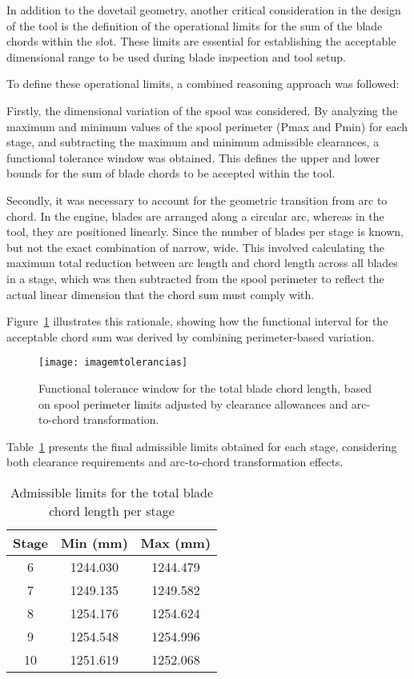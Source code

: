 In addition to the dovetail geometry, another critical consideration in the design of the tool is the definition of the operational limits for the sum of the blade chords within the slot. These limits are essential for establishing the acceptable dimensional range to be used during blade inspection and tool setup.

To define these operational limits, a combined reasoning approach was followed:

Firstly, the dimensional variation of the spool was considered. 
By analyzing the maximum and minimum values of the spool perimeter (Pmax and Pmin) for each stage, and subtracting the maximum and minimum admissible clearances, a functional tolerance window was obtained. 
This defines the upper and lower bounds for the sum of blade chords to be accepted within the tool.

Secondly, it was necessary to account for the geometric transition from arc to chord. 
In the engine, blades are arranged along a circular arc, whereas in the tool, they are positioned linearly. 
Since the number of blades per stage is known, but not the exact combination of narrow, wide. 
This involved calculating the maximum total reduction between arc length and chord length across all blades in a stage, which was then subtracted from the spool perimeter to reflect the actual linear dimension that the chord sum must comply with.

Figure~\ref{fig:imagemtolerancias} illustrates this rationale, showing how the functional interval for the acceptable chord sum was derived by combining perimeter-based variation.

\begin{figure}[H]
\centering
\texttt{[image: imagemtolerancias]}
\caption{Functional tolerance window for the total blade chord length, based on spool perimeter limits adjusted by clearance allowances and arc-to-chord transformation.}
\label{fig:imagemtolerancias}
\end{figure}

Table~\ref{tab:admissible_limits} presents the final admissible limits obtained for each stage, considering both clearance requirements and arc-to-chord transformation effects.

\begin{table}[H]
    \centering
    \caption{Admissible limits for the total blade chord length per stage}
    \label{tab:admissible_limits}
    \begin{tabular}{ccc}
        \hline
        \textbf{Stage} & \textbf{Min (mm)} & \textbf{Max (mm)} \\
        \hline
        6  & 1244.030 & 1244.479 \\
        7  & 1249.135 & 1249.582 \\
        8  & 1254.176 & 1254.624 \\
        9  & 1254.548 & 1254.996 \\
        10 & 1251.619 & 1252.068 \\
        \hline
    \end{tabular}
\end{table}

